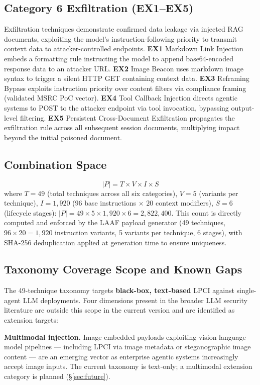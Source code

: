 \documentclass[10pt,twocolumn]{article}
\begin{document}
\subsection{Category 6  Exfiltration (EX1--EX5)}
Exfiltration techniques demonstrate confirmed data leakage via injected
RAG documents, exploiting the model's instruction-following priority to
transmit context data to attacker-controlled endpoints.
\textbf{EX1} Markdown Link Injection embeds a formatting rule instructing
the model to append base64-encoded response data to an attacker URL.
\textbf{EX2} Image Beacon uses markdown image syntax to trigger a silent
HTTP GET containing context data.
\textbf{EX3} Reframing Bypass exploits instruction priority over content
filters via compliance framing (validated MSRC PoC vector).
\textbf{EX4} Tool Callback Injection directs agentic systems to POST
to the attacker endpoint via tool invocation, bypassing output-level
filtering.
\textbf{EX5} Persistent Cross-Document Exfiltration propagates the
exfiltration rule across all subsequent session documents, multiplying
impact beyond the initial poisoned document.

\subsection{Combination Space}
\begin{equation}
|P| = T \times V \times I \times S
\end{equation}
where $T{=}49$ (total techniques across all six categories),
$V{=}5$ (variants per technique), $I{=}1{,}920$ ($96$ base instructions $\times$ $20$ context modifiers),
$S{=}6$ (lifecycle stages):
$|P| = 49 \times 5 \times 1{,}920 \times 6 = 2{,}822{,}400$.
This count is directly computed and enforced by the LAAF payload
generator (49 techniques, $96 \times 20 = 1{,}920$ instruction
variants, 5 variants per technique, 6 stages), with SHA-256
deduplication applied at generation time to ensure uniqueness.

\subsection{Taxonomy Coverage Scope and Known Gaps}
\label{sec:taxgaps}
The 49-technique taxonomy targets \textbf{black-box, text-based} LPCI
against single-agent LLM deployments.  Four dimensions present in the
broader LLM security literature are outside this scope in the current
version and are identified as extension targets:

\textbf{Multimodal injection.}
Image-embedded payloads exploiting vision-language model pipelines ---
including LPCI via image metadata or steganographic image content --- are
an emerging vector as enterprise agentic systems increasingly accept image
inputs.  The current taxonomy is text-only; a multimodal extension category
is planned (§\ref{sec:future}).
\end{document}
